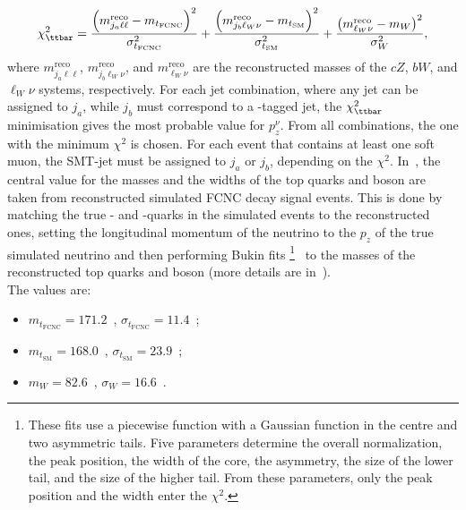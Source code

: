 \begin{equation}
\chi^2_{\ttbar}  =  \frac{\left(m^{\mathrm{reco}}_{j_a\ell\ell}-m_{t_{\mathrm{FCNC}}}\right)^2}{\sigma_{t_{\mathrm{FCNC}}}^2}+
\frac{\left(m^{\mathrm{reco}}_{j_b\ell_W\nu}-m_{t_{\mathrm{SM}}}\right)^2}{\sigma_{t_{\mathrm{SM}}}^2}
+ \frac{\left(m^{\mathrm{reco}}_{\ell_W\nu}-m_W\right)^2}{\sigma_W^2},
\label{eq:chi2tt}
\end{equation}
where $m^{\mathrm{reco}}_{j_a\ell\ell}$, 
$m^{\mathrm{reco}}_{j_b\ell_W\nu}$, and $m^{\mathrm{reco}}_{\ell_W\nu}$ are 
the reconstructed masses of the $cZ$, $bW$, and $\ell_W\nu$ systems, respectively.
For each jet combination, where any jet can be assigned to $j_a$, while $j_b$ must correspond to a \Pqb-tagged jet, the $\chi^2_{\ttbar}$ minimisation gives the most probable value for $p^{\nu}_z$. From all combinations, the one with the minimum $\chi^2$ is chosen.
For each event that contains at least one soft muon, the SMT-jet must be assigned to $j_a$ or $j_b$, depending on the $\chi^2$.
In~, the central value for the masses and the widths of the top quarks and \PW boson are taken from reconstructed simulated FCNC \ttbar decay signal events. This is done by matching the true \Pqc- and \Pqb-quarks in the simulated events to the reconstructed ones, setting the longitudinal momentum of the neutrino to the $p_z$ of the true simulated neutrino and then performing Bukin fits
\footnote{These fits use a piecewise function with  a Gaussian function in the centre and two 		
	asymmetric tails. Five parameters determine the overall normalization, the peak position, the width of the core, the asymmetry, the size of the lower tail, and the size of the higher tail. From these parameters, only the peak position and the width enter the $\chi^2$.}~\cite{Bukin} 
to the masses of the reconstructed top quarks and \PW boson (more details are in~). \\
The values are: 
\begin{itemize}
	\item $m_{t_{\mathrm{FCNC}}}=171.2$~\GeV,  $\sigma_{t_{\mathrm{FCNC}}}=11.4$~\GeV;
	\item $m_{t_{\mathrm{SM}}}=168.0$~\GeV,  $\sigma_{t_{\mathrm{SM}}}=23.9$~\GeV;
	\item $m_W=82.6$~\GeV,  $\sigma_W=16.6$~\GeV.
\end{itemize}	

